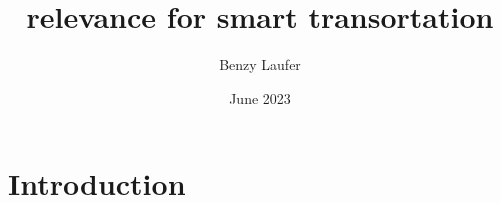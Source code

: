 \documentclass{article}
\title{relevance for smart transortation}
\author{Benzy Laufer}
\date{June 2023}
\begin{document}
\maketitle

\section{Introduction}
\end{document}
